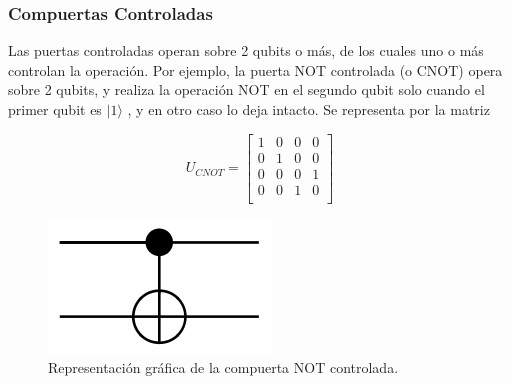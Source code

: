 \subsubsection{Compuertas Controladas}
Las puertas controladas operan sobre 2 qubits o más, de los cuales uno o más controlan la operación. Por ejemplo, la puerta NOT controlada (o CNOT) opera sobre 2 qubits, y realiza la operación NOT en el segundo qubit solo cuando el primer qubit es  $|1\rangle$ , y en otro caso lo deja intacto. Se representa por la matriz
\begin{minipage}{0.5\linewidth}
\begin{equation*}
    U_{CNOT}=\left[\begin{matrix}
    1 & 0 & 0 & 0\\
    0 & 1 & 0 & 0\\
    0 & 0 & 0 & 1\\
    0 & 0 & 1 & 0\\
    \end{matrix}\right]
\end{equation*}
\end{minipage}
\begin{minipage}{0.5\linewidth}
\begin{figure}[H]
        \centering
        \includegraphics[scale=0.7]{images/not_gate.png}
        \caption{Representación gráfica de la compuerta NOT controlada.}
    \end{figure}
\end{minipage}
